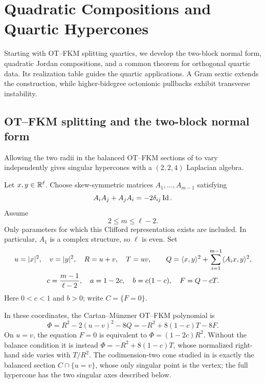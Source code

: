 \section[Quadratic Compositions and Quartics]{Quadratic Compositions and Quartic Hypercones}
\label{sec:two-quadratic}

Starting with OT--FKM splitting quartics, we develop the two-block
normal form, quadratic Jordan compositions, and a common theorem
for orthogonal quartic data. Its realization table guides the quartic
applications. A Gram sextic extends the construction, while
higher-bidegree octonionic pullbacks exhibit transverse instability.

\subsection{OT--FKM splitting and the two-block normal form}

Allowing the two radii in the balanced OT--FKM sections of
\cite{CuiFKM25} to vary independently gives singular hypercones
with a $(2,2,4)$ Laplacian algebra.

Let $x,y\in\mathbb R^\ell$. Choose skew-symmetric matrices
$A_1,\ldots,A_{m-1}$ satisfying
\[
 A_iA_j+A_jA_i=-2\delta_{ij}\operatorname{Id}.
\]
Assume
\begin{equation}\label{bh:range}
 2\leq m\leq\ell-2.
\end{equation}
Only parameters for which this Clifford representation exists are
included. In particular, $A_1$ is a complex structure, so $\ell$ is even.
Set
\begin{gather}\label{bh:quartic-data}
 u=\lvert x\rvert^2,\quad v=\lvert y\rvert^2,\quad R=u+v,\quad T=uv,\qquad
 Q=\langle x,y\rangle^2+\sum_{i=1}^{m-1}\langle A_i x,y\rangle^2,\\
 c=\frac{m-1}{\ell-2},\quad a=1-2c,\quad b=c(1-c),\quad
 F=Q-cT.\label{bh:centered}
\end{gather}
Here $0<c<1$ and $b>0$; write $C=\{F=0\}$.

\begin{remark}\label{bh:fkm-relation}
In these coordinates, the Cartan--M\"unzner OT--FKM polynomial \cite{FKM81} is
\[
 \Phi=R^2-2(u-v)^2-8Q
      =-R^2+8(1-c)T-8F.
\]
On $u=v$, the equation $F=0$ is equivalent to
$\Phi=(1-2c)R^2$. Without the balance condition it is instead
$\Phi=-R^2+8(1-c)T$, whose normalized right-hand side varies with
$T/R^2$. The codimension-two cone studied in \cite{CuiFKM25}
is exactly the balanced section $C\cap\{u=v\}$, whose only singular
point is the vertex; the full hypercone has the two singular axes
described below.
\end{remark}


